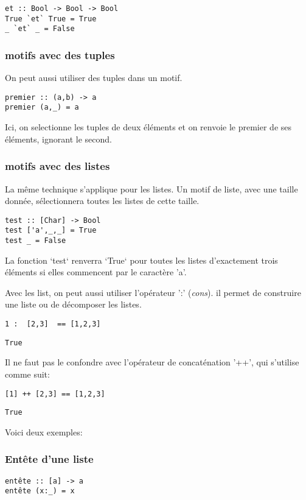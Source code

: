 \documentclass[11pt]{article}
\begin{document}
\begin{verbatim}
et :: Bool -> Bool -> Bool
True `et` True = True
_ `et` _ = False
\end{verbatim}

\subsubsection{motifs avec des tuples}
\label{sec:orged3f54c}
On peut aussi utiliser des tuples dans un motif.  
\begin{verbatim}
premier :: (a,b) -> a
premier (a,_) = a
\end{verbatim}
Ici, on selectionne les tuples de deux éléments et on renvoie le premier de ses éléments, ignorant le second.

\subsubsection{motifs avec des listes}
\label{sec:org3dae041}

La même technique s'applique pour les listes.   Un motif de liste, avec une taille donnée, sélectionnera toutes les listes de cette taille.

\begin{verbatim}
test :: [Char] -> Bool 
test ['a',_,_] = True
test _ = False
\end{verbatim}

La fonction `test` renverra `True` pour toutes les listes d'exactement trois éléments si elles commencent par le caractère 'a'.

Avec les list, on peut aussi utiliser l'opérateur ':' (\emph{cons}).  il permet de construire une liste ou de décomposer les listes.

\begin{verbatim}
1 :  [2,3]  == [1,2,3]
\end{verbatim}
\begin{verbatim}
True
\end{verbatim}


Il ne faut pas le confondre avec l'opérateur de concaténation '++', qui s'utilise comme suit:
\begin{verbatim}
[1] ++ [2,3] == [1,2,3]
\end{verbatim}
\begin{verbatim}
True
\end{verbatim}


Voici deux exemples:
\subsubsection{Entête d'une liste}
\label{sec:org7e51ecf}
\begin{verbatim}
entête :: [a] -> a
entête (x:_) = x 
\end{verbatim}
\end{document}

